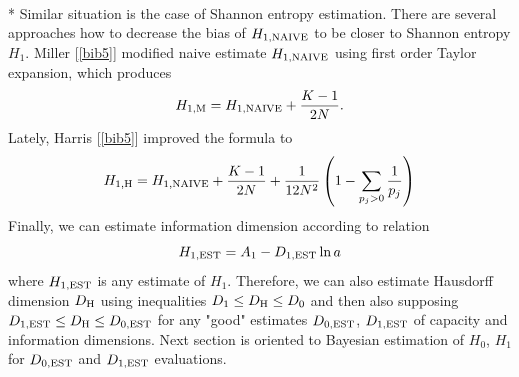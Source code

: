 \documentclass[a4paper,10pt]{article}
\begin{document}
\\*
Similar situation is the case of Shannon entropy estimation. There are several approaches how to decrease the bias of $H_{1,\mbox{\scriptsize{NAIVE}}}$ to be closer to Shannon entropy $H_{1}$. Miller [\ref{bib5}] modified naive estimate $H_{1,\mbox{\scriptsize{NAIVE}}}$ using first order Taylor expansion, which produces
\begin{equation}
\label{eq:miller}
H_{1,\mbox{\scriptsize{M}}}=H_{1,\mbox{\scriptsize{NAIVE}}} + \frac{K-1}{2N}.
\end{equation}
Lately, Harris [\ref{bib5}] improved the formula to
\begin{equation}
\label{eq:harris1h}
H_{1,\mbox{\scriptsize{H}}}=H_{1,\mbox{\scriptsize{NAIVE}}} + \frac{K-1}{2N} + \frac{1}{12N^2} \left( 1 - \sum_{p_{j}>0}\frac{1}{p_{j}} \right)
\end{equation}
Finally, we can estimate information dimension according to relation
\begin{equation} 
\label{eq:hjednaest}
H_{1,\mbox{\scriptsize{EST}}}=A_{1} - D_{1,\mbox{\scriptsize{EST}}} \ln{a}
\end{equation} 
where $H_{1,\mbox{\scriptsize{EST}}}$ is any estimate of $H_{1}$. Therefore, we can also estimate Hausdorff dimension $D_{\mbox{\scriptsize{H}}}$ using inequalities $D_{1} \le D_{\mbox{\scriptsize{H}}} \le D_{0}$ and then also supposing $D_{1,\mbox{\scriptsize{EST}}} \le D_{\mbox{\scriptsize{H}}} \le D_{0,\mbox{\scriptsize{EST}}}$ for any "good" estimates $D_{0,\mbox{\scriptsize{EST}}}$, $D_{1,\mbox{\scriptsize{EST}}}$ of capacity and information dimensions. Next section is oriented to Bayesian estimation of $H_{0}$, $H_{1}$ for $D_{0,\mbox{\scriptsize{EST}}}$ and $D_{1,\mbox{\scriptsize{EST}}}$ evaluations.
\end{document}
